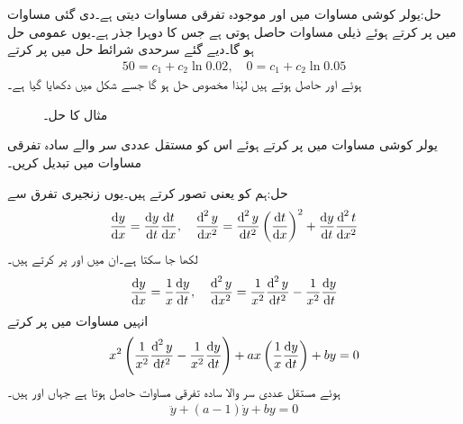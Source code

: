 حل:یولر کوشی مساوات میں  اور  موجودہ تفرقی مساوات دیتی ہے۔دی گئی مساوات میں  پر کرتے ہوئے ذیلی مساوات  حاصل ہوتی ہے جس کا دوہرا جذر  ہے۔یوں عمومی  حل  ہو گا۔دیے گئے سرحدی شرائط حل میں پر کرتے 
\begin{align*}
50=c_1+c_2\ln 0.02, \quad 0=c_1+c_2\ln 0.05
\end{align*}
ہوئے  اور  حاصل ہوتے ہیں لہٰذا مخصوص حل  ہو گا جسے شکل  میں دکھایا گیا ہے۔
\begin{figure}
\centering
{}
\caption{مثال  کا حل۔}
\label{شکل_مثال_سادہ_دو_ہم_محوری_نلکی_میدان}
\end{figure}
یولر کوشی مساوات  میں  پر کرتے ہوئے اس کو مستقل عددی سر والے سادہ تفرقی مساوات میں تبدیل کریں۔

حل:ہم  کو  یعنی  تصور کرتے ہیں۔یوں زنجیری تفرق سے
\begin{align*}
\frac{\dif y}{\dif x}=\frac{\dif y}{\dif t}\frac{\dif t}{\dif x}, \quad \frac{\dif^{\,2} y}{\dif x^2}=\frac{\dif^{\,2}y}{\dif t^2}\left(\frac{\dif t}{\dif x}\right)^2+\frac{\dif y}{\dif t}\frac{\dif^{\,2} t}{\dif x^2}
\end{align*}
لکھا جا سکتا ہے۔ان میں  اور  پر کرتے ہیں۔
\begin{align*}
\frac{\dif y}{\dif x}=\frac{1}{x}\frac{\dif y}{\dif t}, \quad \frac{\dif^{\,2} y}{\dif x^2}=\frac{1}{x^2}\frac{\dif^{\,2}y}{\dif t^2}-\frac{1}{x^2}\frac{\dif y}{\dif t}
\end{align*}
انہیں مساوات  میں پر کرتے 
\begin{align*}
x^2\left(\frac{1}{x^2}\frac{\dif^{\,2}y}{\dif t^2}-\frac{1}{x^2}\frac{\dif y}{\dif t}\right)+ax\left(\frac{1}{x}\frac{\dif y}{\dif t}\right)+by=0
\end{align*}
ہوئے مستقل عددی سر والا سادہ تفرقی مساوات حاصل ہوتا ہے  جہاں  اور  ہیں۔
\begin{align}
\ddot{y}+(a-1)\dot{y}+by=0
\end{align}

